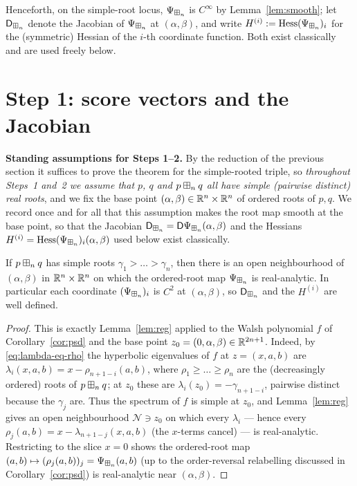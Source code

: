 \noindent Henceforth, on the simple-root locus, $\Psi_{\boxplus_n}$ is $C^\infty$ by
Lemma~\ref{lem:smooth}; let $\mathsf{D}_{\boxplus_n}$ denote the Jacobian of $\Psi_{\boxplus_n}$ at
$(\alpha,\beta)$, and write $H^{(i)}:=\operatorname{Hess}(\Psi_{\boxplus_n})_i$ for the
(symmetric) Hessian of the $i$-th coordinate function. Both exist classically and
are used freely below.

\section*{Step 1: score vectors and the Jacobian}

\noindent\textbf{Standing assumptions for Steps 1--2.} By the reduction of the
previous section it suffices to prove the theorem for the simple-rooted triple,
so \emph{throughout Steps~1 and~2 we assume that $p$, $q$ and $p\boxplus_n q$ all
have simple (pairwise distinct) real roots}, and we fix the base point
$(\alpha,\beta)\in\mathbb{R}^n\times\mathbb{R}^n$ of ordered roots of $p,q$. We record
once and for all that this assumption makes the root map smooth at the base
point, so that the Jacobian $\mathsf{D}_{\boxplus_n}=\mathsf D\Psi_{\boxplus_n}(\alpha,\beta)$ and
the Hessians $H^{(i)}=\operatorname{Hess}(\Psi_{\boxplus_n})_i(\alpha,\beta)$ used below exist
classically.

\begin{qfourlemma}\label{lem:rootreg}
If $p\boxplus_n q$ has simple roots $\gamma_1>\dots>\gamma_n$, then there is an open
neighbourhood of $(\alpha,\beta)$ in $\mathbb{R}^n\times\mathbb{R}^n$ on which the
ordered-root map $\Psi_{\boxplus_n}$ is real-analytic. In particular each coordinate
$(\Psi_{\boxplus_n})_i$ is $C^2$ at $(\alpha,\beta)$, so $\mathsf{D}_{\boxplus_n}$ and the $H^{(i)}$
are well defined.
\end{qfourlemma}

\begin{proof}
This is exactly Lemma~\ref{lem:reg} applied to the Walsh polynomial $f$ of
Corollary~\ref{cor:psd} and the base point $z_0=(0,\alpha,\beta)\in\mathbb{R}^{2n+1}$.
Indeed, by \eqref{eq:lambda-eq-rho} the hyperbolic eigenvalues of $f$ at
$z=(x,a,b)$ are $\lambda_i(x,a,b)=x-\rho_{n+1-i}(a,b)$, where
$\rho_1\ge\dots\ge\rho_n$ are the (decreasingly ordered) roots of $p\boxplus_n q$;
at $z_0$ these are $\lambda_i(z_0)=-\gamma_{n+1-i}$, pairwise distinct because the
$\gamma_j$ are. Thus the spectrum of $f$ is simple at $z_0$, and
Lemma~\ref{lem:reg} gives an open neighbourhood $\mathcal N\ni z_0$ on which every
$\lambda_i$ — hence every $\rho_j(a,b)=x-\lambda_{n+1-j}(x,a,b)$ (the $x$-terms
cancel) — is real-analytic. Restricting to the slice $x=0$ shows the ordered-root
map $(a,b)\mapsto(\rho_j(a,b))_j=\Psi_{\boxplus_n}(a,b)$ (up to the order-reversal
relabelling discussed in Corollary~\ref{cor:psd}) is real-analytic near
$(\alpha,\beta)$.
\end{proof}


